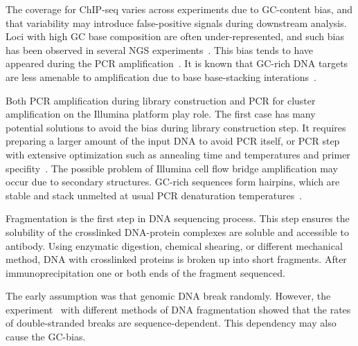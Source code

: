 
The coverage for ChIP-seq varies across experiments due to GC-content bias, and that variability may introduce false-positive signals during downstream analysis.
Loci with high GC base composition are often under-represented, and such bias has been observed in several NGS experiments~\cite{benjamini2012summarizing,dohm2008substantial,teng2017accounting}.
This bias tends to have appeared during the PCR amplification~\cite{ross2013characterizing}.
It is known that GC-rich DNA targets are less amenable to amplification due to base base-stacking interations~\cite{yakovchuk2006base}.

Both PCR amplification during library construction and PCR for cluster amplification on the Illumina platform play role. 
The first case has many potential solutions to avoid the bias during library construction step.
It requires preparing a larger amount of the input DNA to avoid PCR itself, or PCR step with extensive optimization such as annealing time and temperatures and primer specifity~\cite{aird2011analyzing}.
The possible problem of Illumina cell flow bridge amplification may occur due to secondary structures.
GC-rich sequences form hairpins, which are stable and stack unmelted at usual PCR denaturation temperatures~\cite{stein2010nucleosome}.

Fragmentation is the first step in DNA sequencing process.
This step ensures the solubility of the crosslinked DNA-protein complexes are soluble and accessible to antibody.
Using enzymatic digestion, chemical shearing, or different mechanical method, DNA with crosslinked proteins is broken up into short fragments.
After immunoprecipitation one or both ends of the fragment sequenced.

The early assumption was that genomic DNA break randomly.
However, the experiment~\cite{poptsova2014non} with different methods of DNA fragmentation showed that the rates of double-stranded breaks are sequence-dependent.
This dependency may also cause the GC-bias. 

